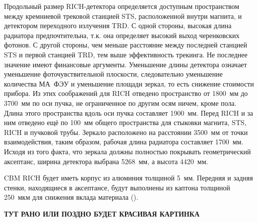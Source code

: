 Продольный размер RICH-детектора определяется доступным пространством между кремниевой трековой станцией STS, расположенной внутри магнита, и детектором переходного излучения TRD. С одной стороны, высокая длина радиатора предпочтительна, т.к. она определяет высокий выход черенковских фотонов. С другой стороны, чем меньше расстояние между последней станцией STS и первой станцией TRD, тем выше эффективность трекинга. Не последнее значение имеют финансовые аргументы. Уменьшение длины детектора означает уменьшение фоточувствительной плоскости, следовательно уменьшение количества МА~ФЭУ и уменьшение площади зеркал, то есть снижение стоимости прибора.
Из этих соображений для RICH отведено пространство от 1800~мм до 3700~мм по оси пучка, не ограниченное по другим осям ничем, кроме пола. Длина этого пространства вдоль оси пучка составляет 1900~мм. Перед RICH и за ним отведено ещё по 100~мм общего пространства для стыковки магнита, STS, RICH и пучковой трубы. Зеркало расположено на расстоянии 3500~мм от точки взаимодействия, таким образом, рабочая длина радиатора составляет 1700~мм. Исходя из того факта, что зеркала должны полностью покрывать геометрический аксептанс, ширина детектора выбрана 5268~мм, а высота 4420~мм.

CBM RICH будет иметь корпус из алюминия толщиной 5~мм. Передняя и задняя стенки, находящиеся в аксептансе, будут выполнены из каптона толщиной 250~мкм для снижения вклада материала (\cite{TDR_RICH}).



\textbf{ТУТ РАНО ИЛИ ПОЗДНО БУДЕТ КРАСИВАЯ КАРТИНКА}

